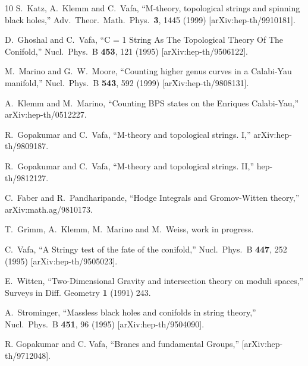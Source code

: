 \documentclass[12pt]{article}
\begin{document}
\begin{thebibliography}{10}
  S.~Katz, A.~Klemm and C.~Vafa,
  ``M-theory, topological strings and spinning black holes,''
  Adv.\ Theor.\ Math.\ Phys.\  {\bf 3}, 1445 (1999)
  [arXiv:hep-th/9910181].

  D.~Ghoshal and C.~Vafa,
  ``C = 1 String As The Topological Theory Of The Conifold,''
  Nucl.\ Phys.\ B {\bf 453}, 121 (1995)
  [arXiv:hep-th/9506122].

  M.~Marino and G.~W.~Moore,
  ``Counting higher genus curves in a Calabi-Yau manifold,''
  Nucl.\ Phys.\ B {\bf 543}, 592 (1999)
  [arXiv:hep-th/9808131].

  A.~Klemm and M.~Marino,
   ``Counting BPS states on the Enriques Calabi-Yau,''
  arXiv:hep-th/0512227.


  R.~Gopakumar and C.~Vafa,
  ``M-theory and topological strings. I,''
  arXiv:hep-th/9809187.

  R.~Gopakumar and C.~Vafa,
 ``M-theory and topological strings. II,''
   hep-th/9812127.

  C.~Faber and R.~Pandharipande,
   ``Hodge Integrals and Gromov-Witten theory,''
  arXiv:math.ag/9810173.

T.~Grimm, A.~Klemm, M.~Marino and M.~Weiss, work in progress.

  C.~Vafa,
   ``A Stringy test of the fate of the conifold,''
  Nucl.\ Phys.\ B {\bf 447}, 252 (1995)
  [arXiv:hep-th/9505023].


 E.~Witten, ``Two-Dimensional Gravity and intersection theory on  moduli spaces,''
Surveys in Diff. Geometry {\bf 1} (1991) 243.



  A.~Strominger,
   ``Massless black holes and conifolds in string theory,''
  Nucl.\ Phys.\ B {\bf 451}, 96 (1995)
  [arXiv:hep-th/9504090].


 R. Gopakumar and C. Vafa, ``Branes and fundamental Groups,''
  [arXiv:hep-th/9712048].




\end{thebibliography}
\end{document}
